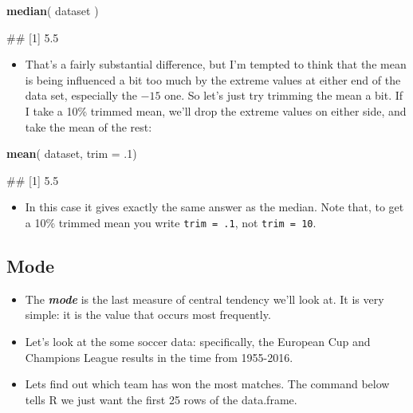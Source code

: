 \documentclass[
]{book}
\newenvironment{Shaded}{\begin{snugshade}}{\end{snugshade}}
\newcommand{\AttributeTok}[1]{\textcolor[rgb]{0.13,0.29,0.53}{#1}}
\newcommand{\DecValTok}[1]{\textcolor[rgb]{0.00,0.00,0.81}{#1}}
\newcommand{\FunctionTok}[1]{\textcolor[rgb]{0.13,0.29,0.53}{\textbf{#1}}}
\newcommand{\NormalTok}[1]{#1}
\providecommand{\tightlist}{%
  \setlength{\itemsep}{0pt}\setlength{\parskip}{0pt}}
\begin{document}
\begin{Shaded}
\begin{Highlighting}[]
\FunctionTok{median}\NormalTok{( dataset )}
\end{Highlighting}
\end{Shaded}

\begin{Shaded}
\begin{Highlighting}[]
\NormalTok{\#\# [1] 5.5}
\end{Highlighting}
\end{Shaded}

\begin{itemize}
\tightlist
\item
  That's a fairly substantial difference, but I'm tempted to think that the mean is being influenced a bit too much by the extreme values at either end of the data set, especially the \(-15\) one. So let's just try trimming the mean a bit. If I take a 10\% trimmed mean, we'll drop the extreme values on either side, and take the mean of the rest:
\end{itemize}

\begin{Shaded}
\begin{Highlighting}[]
\FunctionTok{mean}\NormalTok{( dataset, }\AttributeTok{trim =}\NormalTok{ .}\DecValTok{1}\NormalTok{)}
\end{Highlighting}
\end{Shaded}

\begin{Shaded}
\begin{Highlighting}[]
\NormalTok{\#\# [1] 5.5}
\end{Highlighting}
\end{Shaded}

\begin{itemize}
\tightlist
\item
  In this case it gives exactly the same answer as the median. Note that, to get a 10\% trimmed mean you write \texttt{trim\ =\ .1}, not \texttt{trim\ =\ 10}.
\end{itemize}

\hypertarget{mode}{%
\subsection{Mode}\label{mode}}

\begin{itemize}
\item
  The \textbf{\emph{mode}} is the last measure of central tendency we'll look at. It is very simple: it is the value that occurs most frequently.
\item
  Let's look at the some soccer data: specifically, the European Cup and Champions League results in the time from 1955-2016.
\item
  Lets find out which team has won the most matches. The command below tells R we just want the first 25 rows of the data.frame.
\end{itemize}
\end{document}

